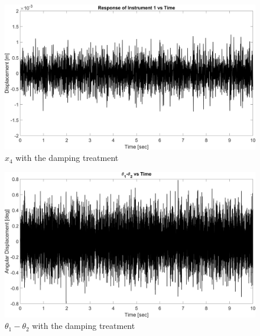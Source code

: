 \documentclass{article}
\begin{document}
\begin{figure}[H]
    \vspace{-10pt}
    \includegraphics[width=1\textwidth,left]{MCHE 6390/Project 2/Figures/Figure_5.png}
    \captionsetup{justification=raggedright,singlelinecheck=false}
    \caption{$x_{4}$ with the damping treatment}
    \label{fig:x4damp}
\end{figure}
\begin{figure}[H]
    \vspace{-10pt}
    \includegraphics[width=1\textwidth,left]{MCHE 6390/Project 2/Figures/Figure_6.png}
    \captionsetup{justification=raggedright,singlelinecheck=false}
    \caption{$\theta_{1}-\theta_{2}$ with the damping treatment}
    \label{fig:t1t2damp}
\end{figure}
\end{document}
